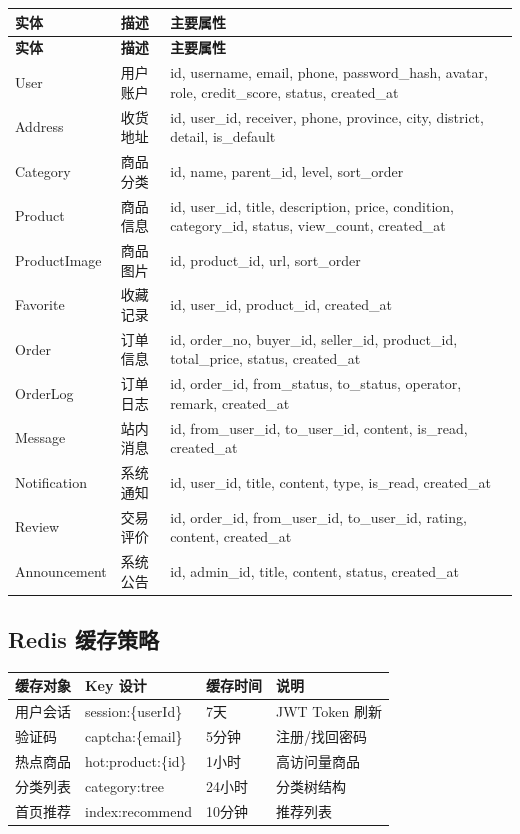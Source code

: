 \documentclass[12pt,a4paper,UTF8]{ctexart}
\begin{document}
\begin{longtable}{p{}|p{}|p{}}
    \toprule
    \textbf{实体} & \textbf{描述} & \textbf{主要属性} \\
    \midrule
    \endfirsthead
    \toprule
    \textbf{实体} & \textbf{描述} & \textbf{主要属性} \\
    \midrule
    \endhead
    \bottomrule
    \endfoot

    User & 用户账户 & id, username, email, phone, password\_hash, avatar, role, credit\_score, status, created\_at \\
    Address & 收货地址 & id, user\_id, receiver, phone, province, city, district, detail, is\_default \\
    Category & 商品分类 & id, name, parent\_id, level, sort\_order \\
    Product & 商品信息 & id, user\_id, title, description, price, condition, category\_id, status, view\_count, created\_at \\
    ProductImage & 商品图片 & id, product\_id, url, sort\_order \\
    Favorite & 收藏记录 & id, user\_id, product\_id, created\_at \\
    Order & 订单信息 & id, order\_no, buyer\_id, seller\_id, product\_id, total\_price, status, created\_at \\
    OrderLog & 订单日志 & id, order\_id, from\_status, to\_status, operator, remark, created\_at \\
    Message & 站内消息 & id, from\_user\_id, to\_user\_id, content, is\_read, created\_at \\
    Notification & 系统通知 & id, user\_id, title, content, type, is\_read, created\_at \\
    Review & 交易评价 & id, order\_id, from\_user\_id, to\_user\_id, rating, content, created\_at \\
    Announcement & 系统公告 & id, admin\_id, title, content, status, created\_at \\
\end{longtable}

\subsection{Redis 缓存策略}

\begin{longtable}{p{}|p{}|p{}|p{}}
    \toprule
    \textbf{缓存对象} & \textbf{Key 设计} & \textbf{缓存时间} & \textbf{说明} \\
    \midrule
    \endhead
    \bottomrule
    \endfoot

    用户会话 & session:\{userId\} & 7天 & JWT Token 刷新 \\
    验证码 & captcha:\{email\} & 5分钟 & 注册/找回密码 \\
    热点商品 & hot:product:\{id\} & 1小时 & 高访问量商品 \\
    分类列表 & category:tree & 24小时 & 分类树结构 \\
    首页推荐 & index:recommend & 10分钟 & 推荐列表 \\
\end{longtable}
\end{document}
